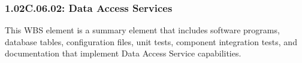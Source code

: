 \subsubsection{1.02C.06.02: Data Access Services}

This WBS element is a summary element that includes software programs, database tables, configuration files, unit tests, component integration tests, and documentation that implement Data Access Service capabilities.
